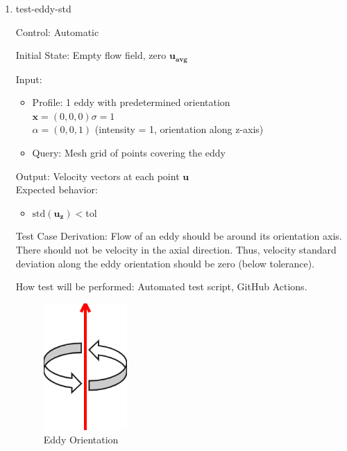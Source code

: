 \documentclass[12pt, titlepage]{article}
\begin{document}
\begin{enumerate}
  \newpage
  \item{test-eddy-std\\}

  Control: Automatic
            
  Initial State: Empty flow field, zero $\mathbf{u_{avg}}$
            
  Input:
  \begin{itemize}
    \item Profile: 1 eddy with predetermined orientation\\
    $\mathbf{x}=(0,0,0)$\tab$\sigma=1$\\
    $\alpha=(0,0,1)$ (intensity = 1, orientation along z-axis)
    \item Query: Mesh grid of points covering the eddy
  \end{itemize}
  Output: Velocity vectors at each point $\mathbf{u}$\\
  Expected behavior:
  \begin{itemize}
    \item $\text{std}(\mathbf{u_z}) < \text{tol}$
  \end{itemize}

  Test Case Derivation: Flow of an eddy should be around its orientation axis. There should not be velocity in the axial direction. Thus, velocity standard deviation along the eddy orientation should be zero (below tolerance).
            
  How test will be performed: Automated test script, GitHub Actions.

  \begin{figure}[h!]
    \begin{center}
    \includegraphics[width=0.3\textwidth]{eddy-orient.png}
    \caption{Eddy Orientation}
    \label{Fig_EddyOrient} 
    \end{center}
  \end{figure}

\end{enumerate}
\end{document}
